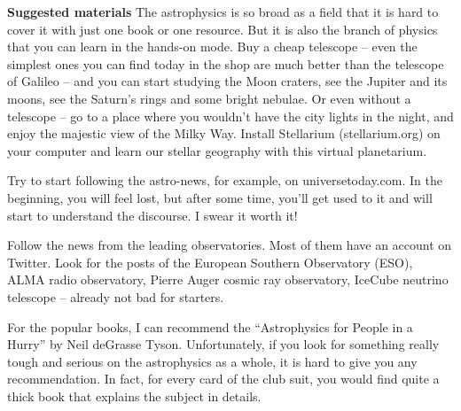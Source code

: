 
\thispagestyle{fancy}
\fancyhf{}
\renewcommand{\headrulewidth}{0pt}
\fancyfoot{}
{\huge{\textbf{Suggested materials}}}
\vskip12pt
The astrophysics is so broad as a field that it is hard to cover it with just one book or one resource. But it is also the branch of physics that you can learn in the hands-on mode. Buy a cheap telescope -- even the simplest ones you can find today in the shop are much better than the telescope of Galileo -- and you can start studying the Moon craters, see the Jupiter and its moons, see the Saturn's rings and some bright nebulae. Or even without a telescope -- go to a place where you wouldn't have the city lights in the night, and enjoy the majestic view of the Milky Way. Install Stellarium (stellarium.org) on your computer and learn our stellar geography with this virtual planetarium.

Try to start following the astro-news, for example, on universetoday.com. In the beginning, you will feel lost, but after some time, you'll get used to it and will start to understand the discourse. I swear it worth it!

Follow the news from the leading observatories. Most of them have an account on Twitter. Look for the posts of the European Southern Observatory (ESO), ALMA radio observatory, Pierre Auger cosmic ray observatory, IceCube neutrino telescope -- already not bad for starters.

For the popular books, I can recommend the ``Astrophysics for People in a Hurry'' by Neil deGrasse Tyson. Unfortunately, if you look for something really tough and serious on the astrophysics as a whole, it is hard to give you any recommendation. In fact, for every card of the club suit, you would find quite a thick book that explains the subject in details.
\newpage